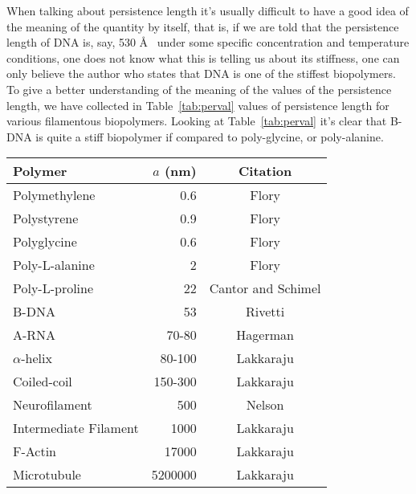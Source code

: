 When talking about persistence length it's usually difficult to have a
good idea of the meaning of the quantity by itself, that is, if we are
told that the  persistence length of DNA is, say,  530 \AA~ under some
specific concentration and temperature  conditions, one does not know
what this is telling us about its stiffness, one can only believe the
author who states that DNA is one of the stiffest biopolymers. To give
a better understanding of the meaning of the values of the persistence
length,  we   have  collected  in   Table~\ref{tab:perval}  values  of
persistence  length for various  filamentous biopolymers.   Looking at
Table~\ref{tab:perval}  it's  clear  that   B-DNA  is  quite  a  stiff
biopolymer if compared to poly-glycine, or poly-alanine.

\begin{table}[htbp]
\begin{center}
\begin{threeparttable}
\begin{tabular}{l|r|c}
\hline
Polymer               & $a$ (nm) & Citation  \\ \hline
Polymethylene         & 0.6      & Flory\tnote{a}      \\  
Polystyrene           & 0.9      & Flory\tnote{a}      \\
Polyglycine           & 0.6      & Flory \tnote{b}     \\
Poly-L-alanine        & 2        & Flory \tnote{b}     \\
Poly-L-proline        & 22       & Cantor and Schimel \cite{cantor1980} \\
B-DNA                 & 53       & Rivetti \cite{rivetti1996}     \\
A-RNA                 & 70-80    & Hagerman  \cite{hagerman1997}  \\
$\alpha$-helix        & 80-100   & Lakkaraju \cite{lakkaraju2009} \\
Coiled-coil           & 150-300  & Lakkaraju \cite{lakkaraju2009} \\
Neurofilament         & 500      & Nelson    \cite{nelson2004}    \\
Intermediate Filament & 1000     & Lakkaraju \cite{lakkaraju2009} \\
F-Actin               & 17000    & Lakkaraju \cite{lakkaraju2009} \\
Microtubule           & 5200000  & Lakkaraju \cite{lakkaraju2009} \\
\hline
\end{tabular}
\begin{tablenotes}

\end{tablenotes}
\end{threeparttable}
\end{center}
\end{table}
